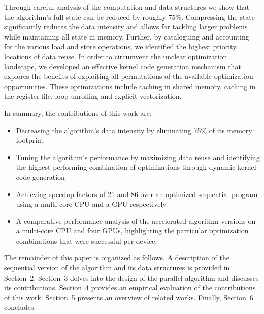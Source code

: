 Through careful analysis of the computation and data structures we show that
the algorithm's full state can be reduced by roughly 75\%. Compressing the
state significantly reduces the data intensity and allows for tackling larger
problems while maintaining all state in memory.
%
Further, by cataloguing and accounting for the various load and store
operations, we identified the highest priority locations of data reuse. In
order to circumvent the unclear optimization landscape, we developed an
effective kernel code generation mechanism that explores the benefits of
exploiting all permutations of the available optimization opportunities. These
optimizations include caching in shared memory, caching in the register file,
loop unrolling and explicit vectorization.

In summary, the contributions of this
work are:
\begin{itemize}
  \item Decreasing the algorithm's data intensity by eliminating 75\% of its
    memory footprint
  \item Tuning the algorithm's performance by maximizing data reuse and
    identifying the highest performing combination of optimizations through
    dynamic kernel code generation
  \item Achieving speedup factors of 21 and 86 over an optimized sequential
    program using a multi-core CPU and a GPU respectively
  \item A comparative performance analysis of the accelerated algorithm
    versions on a multi-core CPU and four GPUs, highlighting the particular
    optimization combinations that were successful per device.
\end{itemize}

The remainder of this paper is organized as follows. A description of the
sequential version of the algorithm and its data structures is provided in
Section~2. Section~3 delves into the design of the parallel algorithm and
discusses its contributions.  Section~4 provides an empirical evaluation of the
contributions of this work.  Section~5 presents an overview of related works.
Finally, Section~6 concludes.

